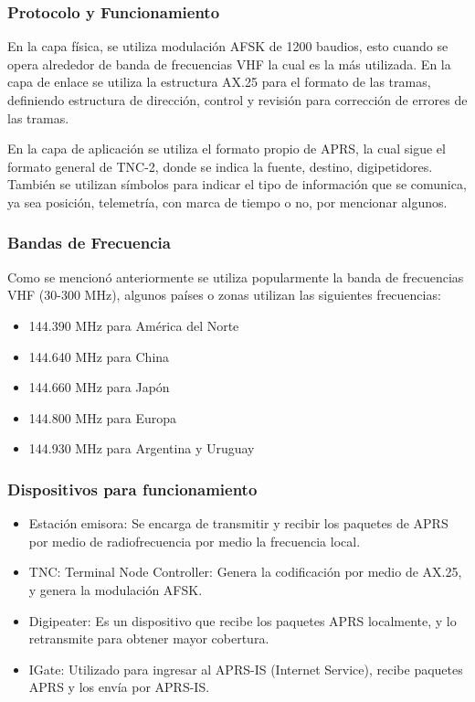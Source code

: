 \documentclass[journal]{IEEEtran}
\begin{document}
\subsubsection{Protocolo y Funcionamiento}

En la capa física, se utiliza modulación AFSK de 1200 baudios, esto cuando se opera alrededor de banda de frecuencias VHF la cual es la más utilizada. En la capa de enlace se utiliza la estructura AX.25 para el formato de las tramas, definiendo estructura de dirección, control y revisión para corrección de errores de las tramas. \cite{kwiecien2013computer}

En la capa de aplicación se utiliza el formato propio de APRS, la cual sigue el formato general de TNC-2, donde se indica la fuente, destino, digipetidores. También se utilizan símbolos para indicar el tipo de información que se comunica, ya sea posición, telemetría, con marca de tiempo o no, por mencionar algunos. \cite{langner2024}

\subsubsection{Bandas de Frecuencia}

Como se mencionó anteriormente se utiliza popularmente la banda de frecuencias VHF (30-300 MHz), algunos países o zonas utilizan las siguientes frecuencias: \cite{sigidwiki_aprs_2023}

\begin{itemize}
    \item 144.390 MHz para América del Norte
    \item 144.640 MHz para China
    \item 144.660 MHz para Japón
    \item 144.800 MHz para Europa
    \item 144.930 MHz para Argentina y Uruguay
\end{itemize}

\subsubsection{Dispositivos para funcionamiento}

\begin{itemize}
    \item Estación emisora: Se encarga de transmitir y recibir los paquetes de APRS por medio de radiofrecuencia por medio la frecuencia local.
    \item TNC: Terminal Node Controller: Genera la codificación por medio de AX.25, y genera la modulación AFSK.
    \item Digipeater: Es un dispositivo que recibe los paquetes APRS localmente, y lo retransmite para obtener mayor cobertura.
    \item IGate: Utilizado para ingresar al APRS-IS (Internet Service), recibe paquetes APRS y los envía por APRS-IS.
\end{itemize}
\end{document}
